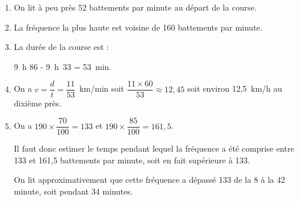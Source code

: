 \begin{enumerate}
\item %
On lit à peu près 52 battements par minute au départ de la course.
\item %
La fréquence la plus haute est voisine de 160 battements par minute.
\item %

La durée de la course est :

9~h 86 - 9~h~33 = 53~min.
\item  %

On a $v = \dfrac{d}{t} = \dfrac{11}{53}$~km/min soit $\dfrac{11 \times 60}{53} \approx 12,45$ soit environ 12,5~km/h au dixième près.
\item %

%
%
On a $190 \times \dfrac{70}{100} = 133$ et $190\times \dfrac{85}{100} = 161,5$.

Il faut donc estimer le temps pendant lequel la fréquence a été comprise entre 133 et 161,5 battements par minute, soit en fait supérieure à 133.

On lit approximativement que cette fréquence a dépassé 133 de la 8 à la 42 minute, soit pendant 34 minutes.
\end{enumerate}

\vspace{0,5cm}

